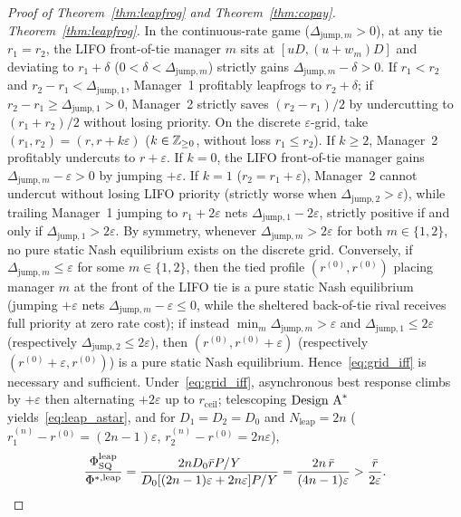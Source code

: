 \begin{proof}[Proof of Theorem~\ref{thm:leapfrog} and Theorem~\ref{thm:copay}]
\emph{Theorem~\ref{thm:leapfrog}.} In the continuous-rate game ($\Delta_{\mathrm{jump}, m} > 0$), at any tie $r_1 = r_2$, the LIFO front-of-tie manager $m$ sits at $[u D, (u + w_m)D]$ and deviating to $r_1 + \delta$ ($0 < \delta < \Delta_{\mathrm{jump}, m}$) strictly gains $\Delta_{\mathrm{jump}, m} - \delta > 0$. If $r_1 < r_2$ and $r_2 - r_1 < \Delta_{\mathrm{jump}, 1}$, Manager~1 profitably leapfrogs to $r_2 + \delta$; if $r_2 - r_1 \ge \Delta_{\mathrm{jump}, 1} > 0$, Manager~2 strictly saves $(r_2 - r_1)/2$ by undercutting to $(r_1 + r_2)/2$ without losing priority. On the discrete $\varepsilon$-grid, take $(r_1, r_2) = (r, r + k\varepsilon)$ ($k \in \mathbb{Z}_{\ge 0}$, without loss $r_1 \le r_2$). If $k \ge 2$, Manager~2 profitably undercuts to $r + \varepsilon$. If $k = 0$, the LIFO front-of-tie manager gains $\Delta_{\mathrm{jump}, m} - \varepsilon > 0$ by jumping $+\varepsilon$. If $k = 1$ ($r_2 = r_1 + \varepsilon$), Manager~2 cannot undercut without losing LIFO priority (strictly worse when $\Delta_{\mathrm{jump}, 2} > \varepsilon$), while trailing Manager~1 jumping to $r_1 + 2\varepsilon$ nets $\Delta_{\mathrm{jump}, 1} - 2\varepsilon$, strictly positive if and only if $\Delta_{\mathrm{jump}, 1} > 2\varepsilon$. By symmetry, whenever $\Delta_{\mathrm{jump}, m} > 2\varepsilon$ for both $m \in \{1, 2\}$, no pure static Nash equilibrium exists on the discrete grid. Conversely, if $\Delta_{\mathrm{jump}, m} \le \varepsilon$ for some $m \in \{1, 2\}$, then the tied profile $(r^{(0)}, r^{(0)})$ placing manager $m$ at the front of the LIFO tie is a pure static Nash equilibrium (jumping $+\varepsilon$ nets $\Delta_{\mathrm{jump}, m} - \varepsilon \le 0$, while the sheltered back-of-tie rival receives full priority at zero rate cost); if instead $\min_m \Delta_{\mathrm{jump}, m} > \varepsilon$ and $\Delta_{\mathrm{jump}, 1} \le 2\varepsilon$ (respectively $\Delta_{\mathrm{jump}, 2} \le 2\varepsilon$), then $(r^{(0)}, r^{(0)} + \varepsilon)$ (respectively $(r^{(0)} + \varepsilon, r^{(0)})$) is a pure static Nash equilibrium. Hence~\eqref{eq:grid_iff} is necessary and sufficient. Under~\eqref{eq:grid_iff}, asynchronous best response climbs by $+\varepsilon$ then alternating $+2\varepsilon$ up to $r_{\mathrm{ceil}}$; telescoping $\textup{Design A}^*$ yields~\eqref{eq:leap_astar}, and for $D_1 = D_2 = D_0$ and $N_{\mathrm{leap}} = 2n$ ($r_1^{(n)} - r^{(0)} = (2n - 1)\varepsilon$, $r_2^{(n)} - r^{(0)} = 2n\varepsilon$),
\[
\frac{\Phi_{\mathrm{SQ}}^{\mathrm{leap}}}{\Phi^{*,\mathrm{leap}}} = \frac{2n D_0 \bar{r}P/Y}{D_0[(2n - 1)\varepsilon + 2n\varepsilon]P/Y} = \frac{2n\,\bar{r}}{(4n - 1)\varepsilon} > \frac{\bar{r}}{2\varepsilon}.
\]


\end{proof}
